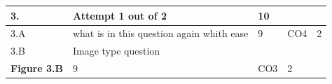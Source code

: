 \documentclass[12pt]{article}
\begin{document}
\begin{longtable}{|L{1cm}|L{8cm}|C{1cm}|C{1cm}|C{1cm}|}\hline
	\bf3. & \bf{Attempt} \bf{1} \bf{out of} \bf{2} & \bf{10}  & & \\ \hline





		3.A &
	what is in this question again whith ease \newline
			
	 &  9 & CO4 & 2\\ \hline
		3.B &
	Image type question \newline
			\begin{center}
		\includegraphics[width=4cm,height=3cm]{media/diagrams/2020/05/27/gameidea.png}\\\bf{Figure }\bf3.B		
	\end{center}
		
	 &  9 & CO3 & 2\\ \hline
	\end{longtable}
\end{document}
